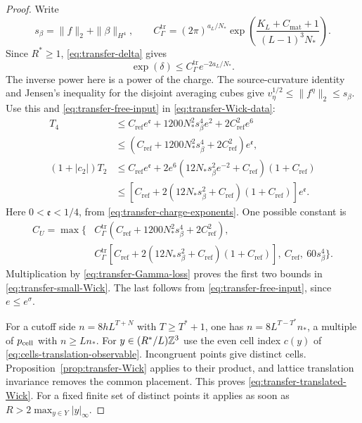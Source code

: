 \begin{proof}
Write
\[
 s_\beta=\|f\|_2+\|\beta\|_{H^4},\qquad
 C_\Gamma^{\mathrm{tr}}=(2\pi)^{a_L/N_*}
         \exp\left(\frac{K_L+C_{\mathrm{mat}}+1}
                                  {(L-1)^3N_*}\right).
\]
Since $R^*\ge1$, \eqref{eq:transfer-delta} gives
\begin{equation}\label{eq:transfer-Gamma-loss}
 \exp(\delta)\le C_\Gamma^{\mathrm{tr}} e^{-2a_L/N_*}.
\end{equation}
The inverse power here is a power of the charge.
The source-curvature identity and Jensen's inequality
for the disjoint averaging cubes give
$v_\eta^{1/2}\le\|f^\eta\|_2\le s_\beta$.
Use this and \eqref{eq:transfer-free-input} in
\eqref{eq:transfer-Wick-data}:
\begin{align*}
 T_4
 &\le C_{\mathrm{ref}} e^{\mathfrak e}
           +1200N_*^2s_\beta^4e^2+2C_{\mathrm{ref}}^2e^6\\
 &\le(C_{\mathrm{ref}}+1200N_*^2s_\beta^4+2C_{\mathrm{ref}}^2)e^{\mathfrak e},\\
 (1+|c_2|)T_2
 &\le C_{\mathrm{ref}} e^{\mathfrak e}
      +2e^6(12N_*s_\beta^2e^{-2}+C_{\mathrm{ref}})(1+C_{\mathrm{ref}})\\
 &\le[C_{\mathrm{ref}}+2(12N_*s_\beta^2+C_{\mathrm{ref}})(1+C_{\mathrm{ref}})]
                                                    e^{\mathfrak e}.
\end{align*}
Here $0<\mathfrak e<1/4$, from
\eqref{eq:transfer-charge-exponents}.
One possible constant is
\begin{equation}\label{eq:transfer-CU}
 \begin{split}
 C_U=\max\{&
 C_\Gamma^{\mathrm{tr}}(C_{\mathrm{ref}}+1200N_*^2s_\beta^4+2C_{\mathrm{ref}}^2),\\
 &C_\Gamma^{\mathrm{tr}}[C_{\mathrm{ref}}+2(12N_*s_\beta^2+C_{\mathrm{ref}})(1+C_{\mathrm{ref}})],
              \ C_{\mathrm{ref}},\ 60s_\beta^4\}.
 \end{split}
\end{equation}
Multiplication by \eqref{eq:transfer-Gamma-loss}
proves the first two bounds in
\eqref{eq:transfer-small-Wick}. The last follows from
\eqref{eq:transfer-free-input}, since $e\le e^\sigma$.

For a cutoff side $n=8hL^{T+N}$ with $T\ge T^*+1$,
one has $n=8L^{T-T^*}n_*$, a multiple of $p_{\rm cell}$ with
$n\ge Ln_*$. For $y\in(R^*/L)\mathbb Z^3$ use the even
cell index $c(y)$ of
\eqref{eq:cells-translation-observable}.
Incongruent points give distinct cells.
Proposition~\ref{prop:transfer-Wick} applies to their
product, and lattice translation invariance removes
the common placement. This proves
\eqref{eq:transfer-translated-Wick}.
For a fixed finite set of distinct points it applies
as soon as $R>2\max_{y\in Y}|y|_\infty$.


\end{proof}
